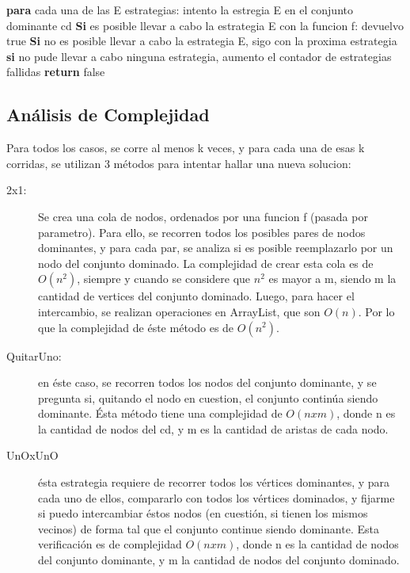 \begin{codebox}
\li	\textbf{para} cada una de las E estrategias: \Do
\li		intento la estregia E en el conjunto dominante cd
\li		\textbf{Si} es posible llevar a cabo la estrategia E con la funcion f: \Do
\li			devuelvo true
\End
\li		\textbf{Si} no es posible llevar a cabo la estrategia E, sigo con la proxima estrategia
\End
\li \textbf{si} no pude llevar a cabo ninguna estrategia, aumento el contador de estrategias fallidas
\li \textbf{return} false
\end{codebox}

\subsection{Análisis de Complejidad}
Para todos los casos, se corre al menos k veces, y para cada una de esas k corridas, se utilizan 3 métodos para intentar hallar una nueva solucion:
\begin{description}
\item[2x1:] Se crea una cola de nodos, ordenados por una funcion f (pasada por parametro). Para ello, se recorren todos los posibles pares de nodos dominantes, y para cada par, se analiza si es posible reemplazarlo por un nodo del conjunto dominado. La complejidad de crear esta cola es de $O(n^2)$, siempre y cuando se considere que $n^2$ es mayor a m, siendo m la cantidad de vertices del conjunto dominado. Luego, para hacer el intercambio, se realizan operaciones en ArrayList, que son $O(n)$. Por lo que la complejidad de éste método es de $O(n^2)$.
\item[QuitarUno:] en éste caso, se recorren todos los nodos del conjunto dominante, y se pregunta si, quitando el nodo en cuestion, el conjunto continúa siendo dominante. Ésta método tiene una complejidad de $O(n x m)$, donde n es la cantidad de nodos del cd, y m es la cantidad de aristas de cada nodo.
 \item[UnOxUnO] ésta estrategia requiere de recorrer todos los vértices dominantes, y para cada uno de ellos, compararlo con todos los vértices dominados, y fijarme si puedo intercambiar éstos nodos (en cuestión, si tienen los mismos vecinos) de forma tal que el conjunto continue siendo dominante. Esta verificación es de complejidad $O(n x m)$, donde n es la cantidad de nodos del conjunto dominante, y m la cantidad de nodos del conjunto dominado.
\end{description}
 
